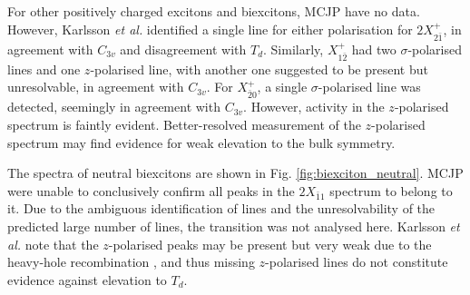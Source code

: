 \\\hfill\\

For other positively charged excitons and biexcitons, MCJP have no data. However, Karlsson \textit{et al.} identified a single line for either polarisation for $2X^+_{2\bar{1}}$, in agreement with $C_{3v}$ and disagreement with $T_d$. Similarly, $X^+_{1\bar{2}}$ had two $\sigma$-polarised lines and one $z$-polarised line, with another one suggested to be present but unresolvable, in agreement with $C_{3v}$. For $X^+_{\bar{2}0}$, a single $\sigma$-polarised line was detected, seemingly in agreement with $C_{3v}$. However, activity in the $z$-polarised spectrum is faintly evident. Better-resolved measurement of the $z$-polarised spectrum may find evidence for weak elevation to the bulk symmetry.

The spectra of neutral biexcitons are shown in Fig. \ref{fig:biexciton_neutral}. MCJP were unable to conclusively confirm all peaks in the $2X_{\bar{1}1}$ spectrum to belong to it. Due to the ambiguous identification of lines and the unresolvability of the predicted large number of lines, the transition was not analysed here. Karlsson \textit{et al.} note that the $z$-polarised peaks may be present but very weak due to the heavy-hole recombination \cite[p. 16]{karlsson}, and thus missing $z$-polarised lines do not constitute evidence against elevation to $T_d$.

